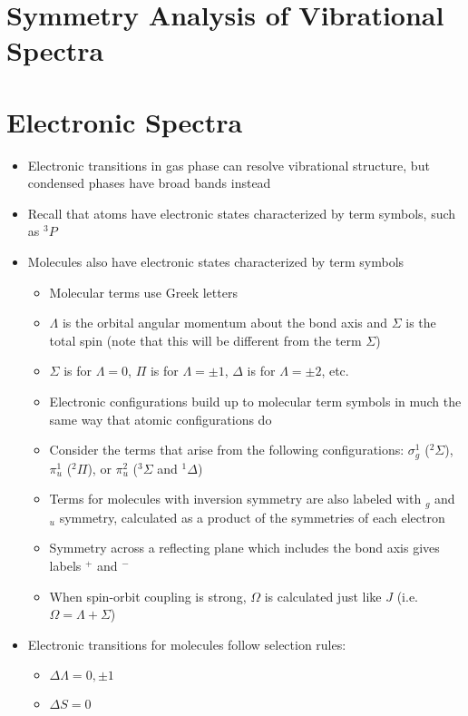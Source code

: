 \documentclass[12pt, openany, letterpaper]{memoir}
\begin{document}
\section{Symmetry Analysis of Vibrational Spectra}

\section{Electronic Spectra}
\begin{itemize}
	\item Electronic transitions in gas phase can resolve vibrational structure, but condensed phases have broad bands instead
	\item Recall that atoms have electronic states characterized by term symbols, such as $^3P$
	\item Molecules also have electronic states characterized by term symbols
	\begin{itemize}
		\item Molecular terms use Greek letters
		\item $\Lambda$ is the orbital angular momentum about the bond axis and $\Sigma$ is the total spin (note that this will be different from the term $\Sigma$)
		\item $\Sigma$ is for $\Lambda=0$, $\Pi$ is for $\Lambda = \pm 1$, $\Delta$ is for $\Lambda = \pm2$, etc.
		\item Electronic configurations build up to molecular term symbols in much the same way that atomic configurations do
		\item Consider the terms that arise from the following configurations: $\sigma_g^1$ ($^2\Sigma$), $\pi_u^1$ ($^2\Pi$), or $\pi_u^2$ ($^3\Sigma$ and $^1\Delta$)
		\item Terms for molecules with inversion symmetry are also labeled with $_g$ and $_u$ symmetry, calculated as a product of the symmetries of each electron
		\item Symmetry across a reflecting plane which includes the bond axis gives labels $^+$ and $^-$
		\item When spin-orbit coupling is strong, $\Omega$ is calculated just like $J$ (i.e. $\Omega = \Lambda + \Sigma$)
	\end{itemize}
	\item Electronic transitions for molecules follow selection rules:
	\begin{itemize}
		\item $\Delta \Lambda = 0, \pm 1$
		\item $\Delta S = 0$

\end{itemize}
\end{itemize}
\end{document}
